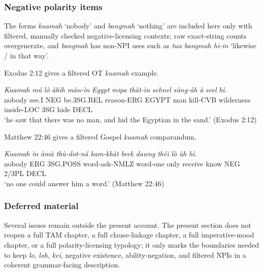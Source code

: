 \documentclass[
  11pt,
  a4paper,
]{article}
\newcommand{\tdim}[1]{\textit{#1}}
\newcommand{\tdimword}[1]{\textit{#1}}
\renewcommand{\textsc}[1]{{\footnotesize\MakeUppercase{#1}}}
\newcommand{\glossquote}[1]{`#1'}
\begin{document}
\subsubsection{Negative polarity items}\label{negative-polarity-items}

The forms \tdim{kuamah} \glossquote{nobody} and \tdim{bangmah}
\glossquote{nothing} are included here only with filtered, manually
checked negative-licensing contexts; raw exact-string counts
overgenerate, and \tdim{bangmah} has non-NPI uses such as
\tdim{tua bangmah hi-in} \glossquote{likewise / in that way}.

Exodus 2:12 gives a filtered OT \tdim{kuamah} example.

\begin{exe}
\ex \label{ex:neg-kuamah}
\gll \tdimword{Kuamah} \tdimword{mú} \tdimword{lò} \tdimword{àhìh} \tdimword{màn-ìn} \tdimword{Egypt} \tdimword{mipa} \tdimword{thàt-ìn} \tdimword{sehnel} \tdimword{sùng-àh} \tdimword{à} \tdimword{seel} \tdimword{hì.} \\
     nobody see.\textsc{i} \textsc{neg} be.\textsc{3sg}.\textsc{rel} reason-\textsc{erg} \textsc{egypt} man kill-\textsc{cvb} wilderness inside-\textsc{loc} \textsc{3sg} hide \textsc{decl} \\
\glt \glossquote{he saw that there was no man, and hid the Egyptian in the sand.} (Exodus 2:12)
\end{exe}

Matthew 22:46 gives a filtered Gospel \tdim{kuamah} comparandum.

\begin{exe}
\ex \label{ex:neg-kuamah-matt22-46}
\gll \tdimword{Kuamah} \tdimword{ìn} \tdimword{àmà} \tdimword{thù-dot-ná} \tdimword{kam-khàt} \tdimword{beek} \tdimword{dawng} \tdimword{théi} \tdimword{lò} \tdimword{ùh} \tdimword{hì.} \\
     nobody \textsc{erg} \textsc{3sg}.\textsc{poss} word-ask-\textsc{nmlz} word-one only receive know \textsc{neg} 2/3PL \textsc{decl} \\
\glt \glossquote{no one could answer him a word.} (Matthew 22:46)
\end{exe}

\subsubsection{Deferred material}\label{deferred-material-9}

Several issues remain outside the present account. The present section
does not reopen a full TAM chapter, a full clause-linkage chapter, a
full imperative-mood chapter, or a full polarity-licensing typology; it
only marks the boundaries needed to keep \tdim{lo}, \tdim{loh},
\tdim{kei}, negative existence, ability-negation, and filtered NPIs in a
coherent grammar-facing description.
\end{document}
